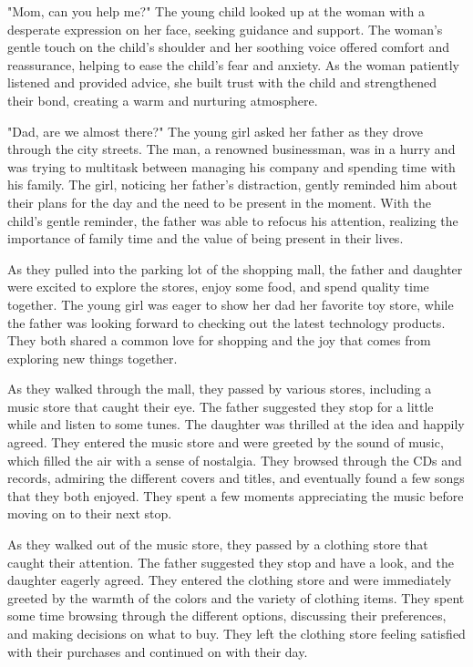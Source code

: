\documentclass[smalldemyvopaper,11pt,twoside,onecolumn,openright,extrafontsizes]{memoir}
\begin{document}
"Mom, can you help me?" The young child looked up at the woman with a desperate expression on her face, seeking guidance and support. The woman's gentle touch on the child's shoulder and her soothing voice offered comfort and reassurance, helping to ease the child's fear and anxiety. As the woman patiently listened and provided advice, she built trust with the child and strengthened their bond, creating a warm and nurturing atmosphere.\par
"Dad, are we almost there?" The young girl asked her father as they drove through the city streets. The man, a renowned businessman, was in a hurry and was trying to multitask between managing his company and spending time with his family. The girl, noticing her father's distraction, gently reminded him about their plans for the day and the need to be present in the moment. With the child's gentle reminder, the father was able to refocus his attention, realizing the importance of family time and the value of being present in their lives.\par
As they pulled into the parking lot of the shopping mall, the father and daughter were excited to explore the stores, enjoy some food, and spend quality time together. The young girl was eager to show her dad her favorite toy store, while the father was looking forward to checking out the latest technology products. They both shared a common love for shopping and the joy that comes from exploring new things together.\par
As they walked through the mall, they passed by various stores, including a music store that caught their eye. The father suggested they stop for a little while and listen to some tunes. The daughter was thrilled at the idea and happily agreed. They entered the music store and were greeted by the sound of music, which filled the air with a sense of nostalgia. They browsed through the CDs and records, admiring the different covers and titles, and eventually found a few songs that they both enjoyed. They spent a few moments appreciating the music before moving on to their next stop.\par
As they walked out of the music store, they passed by a clothing store that caught their attention. The father suggested they stop and have a look, and the daughter eagerly agreed. They entered the clothing store and were immediately greeted by the warmth of the colors and the variety of clothing items. They spent some time browsing through the different options, discussing their preferences, and making decisions on what to buy. They left the clothing store feeling satisfied with their purchases and continued on with their day.\par
\end{document}
